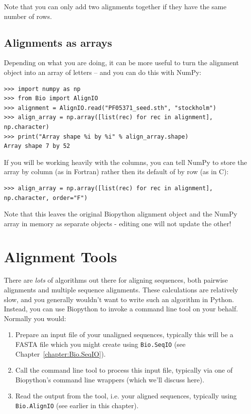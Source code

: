 \documentclass{report}
\begin{document}
\noindent Note that you can only add two alignments together if they
have the same number of rows.

\subsection{Alignments as arrays}
Depending on what you are doing, it can be more useful to turn the alignment
object into an array of letters -- and you can do this with NumPy:

\begin{verbatim}
>>> import numpy as np
>>> from Bio import AlignIO
>>> alignment = AlignIO.read("PF05371_seed.sth", "stockholm")
>>> align_array = np.array([list(rec) for rec in alignment], np.character)
>>> print("Array shape %i by %i" % align_array.shape)
Array shape 7 by 52
\end{verbatim}

If you will be working heavily with the columns, you can tell NumPy to store
the array by column (as in Fortran) rather then its default of by row (as in C):

\begin{verbatim}
>>> align_array = np.array([list(rec) for rec in alignment], np.character, order="F")
\end{verbatim}

Note that this leaves the original Biopython alignment object and the NumPy array
in memory as separate objects - editing one will not update the other!

\section{Alignment Tools}
\label{sec:alignment-tools}

There are \emph{lots} of algorithms out there for aligning sequences, both pairwise alignments
and multiple sequence alignments. These calculations are relatively slow, and you generally
wouldn't want to write such an algorithm in Python. Instead, you can use Biopython to invoke
a command line tool on your behalf. Normally you would:
\begin{enumerate}
\item Prepare an input file of your unaligned sequences, typically this will be a FASTA file
      which you might create using \verb|Bio.SeqIO| (see Chapter~\ref{chapter:Bio.SeqIO}).
\item Call the command line tool to process this input file, typically via one of Biopython's
      command line wrappers (which we'll discuss here).
\item Read the output from the tool, i.e. your aligned sequences, typically using
      \verb|Bio.AlignIO| (see earlier in this chapter). 
\end{enumerate}
\end{document}
